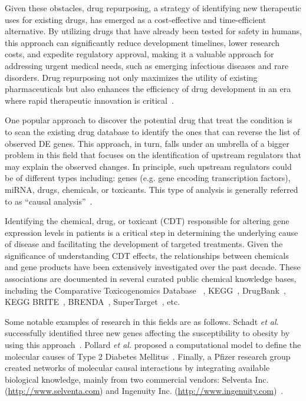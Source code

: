 Given these obstacles, drug repurposing, a strategy of identifying new therapeutic uses for existing drugs, has emerged as a cost-effective and time-efficient alternative. By utilizing drugs that have already been tested for safety in humans, this approach can significantly reduce development timelines, lower research costs, and expedite regulatory approval, making it a valuable approach for addressing urgent medical needs, such as emerging infectious diseases and rare disorders. Drug repurposing not only maximizes the utility of existing pharmaceuticals but also enhances the efficiency of drug development in an era where rapid therapeutic innovation is critical~\cite{ashburn2004drug,chong2007new}.

One popular approach to discover the potential drug that treat the condition is to scan the existing drug database to identify the ones that can reverse the list of observed DE genes.  
This approach, in turn, falls under an umbrella of a bigger problem in this field that focuses on the identification of upstream regulators that may explain the observed changes. In principle, such upstream regulators could be of different types including: genes (e.g. gene encoding transcription factors), miRNA, drugs, chemicals, or toxicants. This type of analysis is generally referred to as ``causal analysis''~\cite{schadt:2005, chindelevitch2012causal, kramer2013causal, felciano2013predictive}. 

Identifying the chemical, drug, or toxicant (CDT) responsible for altering gene expression levels in patients is a critical step in determining the underlying cause of disease and facilitating the development of targeted treatments. Given the significance of understanding CDT effects, the relationships between chemicals and gene products have been extensively investigated over the past decade. These associations are documented in several curated public chemical knowledge bases, including the Comparative Toxicogenomics Database ~\cite{mattingly2006comparative}, KEGG~\cite{Kanehisa:2000},  DrugBank~\cite{law2014drugbank}, KEGG BRITE~\cite{kanehisa2006genomics}, BRENDA~\cite{schomburg2004brenda}, SuperTarget~\cite{gunther2007supertarget}, etc. 


Some notable examples of research in this fields are as follows. Schadt \emph{et al.} successfully identified three new genes affecting the susceptibility to obesity by using this approach~\cite{schadt:2005}.
Pollard \emph{et al.} proposed a computational model to define the molecular causes of Type 2 Diabetes Mellitus~\cite{pollard2005computational}.  Finally, a Pfizer research group created networks of molecular causal interactions by integrating available biological knowledge, mainly from two commercial vendors: Selventa Inc. (\href{http://www.selventa.com}{http://www.selventa.com}) and Ingenuity Inc. (\href{http://www.ingenuity.com}{http://www.ingenuity.com})~\cite{chindelevitch2012causal}.


